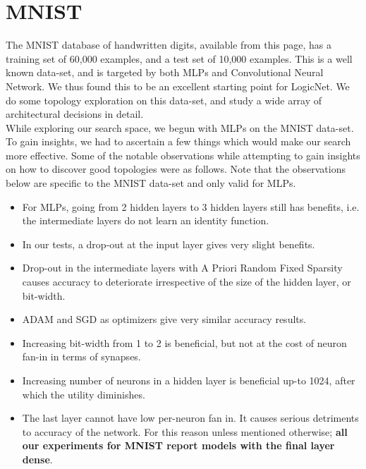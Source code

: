 \chapter{MNIST}\label{ch:mnist}


 
The MNIST database of handwritten digits, available from this page, has a training set of 60,000 examples, and a test set of 10,000 examples. This is a well known data-set, and is targeted by both MLPs and Convolutional Neural Network. We thus found  this to be an excellent starting point for LogicNet. 
We do some topology exploration on this data-set, and study a wide array of architectural decisions in detail. \\

While exploring our search space, we begun with MLPs on the MNIST data-set. To gain insights, we had to ascertain a few things which would make our search more effective. Some of the notable observations while attempting to gain insights on how to discover good topologies were as follows. Note that the observations below are specific to the MNIST data-set and only valid for MLPs.
\begin{itemize}
    \item For MLPs, going from 2 hidden layers to 3 hidden layers still has benefits, i.e. the intermediate layers do not learn an identity function.
    \item In our tests, a drop-out at the input layer gives very slight benefits.
    \item Drop-out in the intermediate layers with A Priori Random Fixed Sparsity causes accuracy to deteriorate irrespective of the size of the hidden layer, or bit-width.
    \item ADAM and SGD as optimizers give very similar accuracy results.
    \item Increasing bit-width from 1 to 2 is beneficial, but not at the cost of neuron fan-in in terms of synapses. 
    \item Increasing number of neurons in a hidden layer is beneficial up-to 1024, after which the utility diminishes. 
    \item The last layer cannot have low per-neuron fan in. It causes serious detriments to accuracy of the network. For this reason unless mentioned otherwise; \textbf{all our experiments for MNIST report models with the final layer dense}.
\end{itemize}

